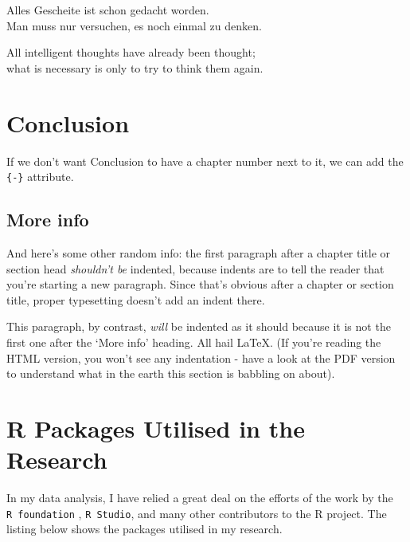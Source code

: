 \documentclass[a4paper, nobind]{templates/ociamthesis}
\begin{document}
\begin{savequote}
Alles Gescheite ist schon gedacht worden.\\
Man muss nur versuchen, es noch einmal zu denken.

All intelligent thoughts have already been thought;\\
what is necessary is only to try to think them again.
\end{savequote}



\hypertarget{conclusion-4}{%
\chapter*{Conclusion}\label{conclusion-4}}

If we don't want Conclusion to have a chapter number next to it, we can add the \texttt{\{-\}} attribute.

\hypertarget{more-info}{%
\section*{More info}\label{more-info}}

And here's some other random info:
the first paragraph after a chapter title or section head \emph{shouldn't be} indented, because indents are to tell the reader that you're starting a new paragraph.
Since that's obvious after a chapter or section title, proper typesetting doesn't add an indent there.

This paragraph, by contrast, \emph{will} be indented as it should because it is not the first one after the `More info' heading.
All hail LaTeX. (If you're reading the HTML version, you won't see any indentation - have a look at the PDF version to understand what in the earth this section is babbling on about).

\startappendices

\hypertarget{r-packages-utilised-in-the-research}{%
\chapter{R Packages Utilised in the Research}\label{r-packages-utilised-in-the-research}}

In my data analysis, I have relied a great deal on the efforts of the work by the \texttt{R\ foundation} \autocite{R}, \texttt{R\ Studio}, and many other contributors to the R project. The listing below shows the packages utilised in my research.
\end{document}
